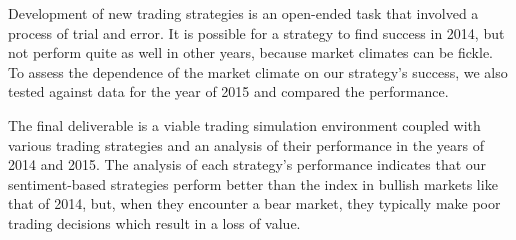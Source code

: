 Development of new trading strategies is an open-ended task that involved a process of trial and error.
It is possible for a strategy to find success in 2014, but not perform quite as well in other years, because market climates can be fickle.
To assess the dependence of the market climate on our strategy's success, we also tested against data for the year of 2015 and compared the performance.

The final deliverable is a viable trading simulation environment coupled with various trading strategies and an analysis of their performance in the years of 2014 and 2015.
The analysis of each strategy's performance indicates that our sentiment-based strategies perform better than the index in bullish markets like that of 2014, but, when they encounter a bear market, they typically make poor trading decisions which result in a loss of value.

